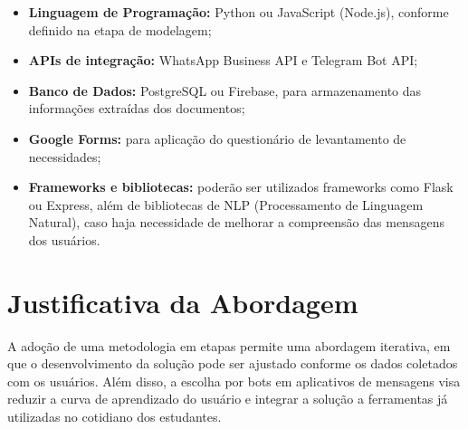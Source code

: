 \begin{itemize}
    \item \textbf{Linguagem de Programação:} Python ou JavaScript (Node.js), conforme definido na etapa de modelagem;
    \item \textbf{APIs de integração:} WhatsApp Business API e Telegram Bot API;
    \item \textbf{Banco de Dados:} PostgreSQL ou Firebase, para armazenamento das informações extraídas dos documentos;
    \item \textbf{Google Forms:} para aplicação do questionário de levantamento de necessidades;
    \item \textbf{Frameworks e bibliotecas:} poderão ser utilizados frameworks como Flask ou Express, além de bibliotecas de NLP (Processamento de Linguagem Natural), caso haja necessidade de melhorar a compreensão das mensagens dos usuários.
\end{itemize}

\section{Justificativa da Abordagem}

A adoção de uma metodologia em etapas permite uma abordagem iterativa, em que o desenvolvimento da solução pode ser ajustado conforme os dados coletados com os usuários. Além disso, a escolha por bots em aplicativos de mensagens visa reduzir a curva de aprendizado do usuário e integrar a solução a ferramentas já utilizadas no cotidiano dos estudantes.

